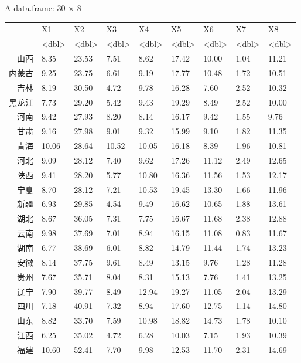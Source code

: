 \documentclass[11pt]{article}
\begin{document}
    A data.frame: 30 × 8
\begin{tabular}{r|llllllll}
  & X1 & X2 & X3 & X4 & X5 & X6 & X7 & X8\\
  & <dbl> & <dbl> & <dbl> & <dbl> & <dbl> & <dbl> & <dbl> & <dbl>\\
\hline
	山西 &  8.35 & 23.53 &  7.51 &  8.62 & 17.42 & 10.00 & 1.04 & 11.21\\
	内蒙古 &  9.25 & 23.75 &  6.61 &  9.19 & 17.77 & 10.48 & 1.72 & 10.51\\
	吉林 &  8.19 & 30.50 &  4.72 &  9.78 & 16.28 &  7.60 & 2.52 & 10.32\\
	黑龙江 &  7.73 & 29.20 &  5.42 &  9.43 & 19.29 &  8.49 & 2.52 & 10.00\\
	河南 &  9.42 & 27.93 &  8.20 &  8.14 & 16.17 &  9.42 & 1.55 &  9.76\\
	甘肃 &  9.16 & 27.98 &  9.01 &  9.32 & 15.99 &  9.10 & 1.82 & 11.35\\
	青海 & 10.06 & 28.64 & 10.52 & 10.05 & 16.18 &  8.39 & 1.96 & 10.81\\
	河北 &  9.09 & 28.12 &  7.40 &  9.62 & 17.26 & 11.12 & 2.49 & 12.65\\
	陕西 &  9.41 & 28.20 &  5.77 & 10.80 & 16.36 & 11.56 & 1.53 & 12.17\\
	宁夏 &  8.70 & 28.12 &  7.21 & 10.53 & 19.45 & 13.30 & 1.66 & 11.96\\
	新疆 &  6.93 & 29.85 &  4.54 &  9.49 & 16.62 & 10.65 & 1.88 & 13.61\\
	湖北 &  8.67 & 36.05 &  7.31 &  7.75 & 16.67 & 11.68 & 2.38 & 12.88\\
	云南 &  9.98 & 37.69 &  7.01 &  8.94 & 16.15 & 11.08 & 0.83 & 11.67\\
	湖南 &  6.77 & 38.69 &  6.01 &  8.82 & 14.79 & 11.44 & 1.74 & 13.23\\
	安徽 &  8.14 & 37.75 &  9.61 &  8.49 & 13.15 &  9.76 & 1.28 & 11.28\\
	贵州 &  7.67 & 35.71 &  8.04 &  8.31 & 15.13 &  7.76 & 1.41 & 13.25\\
	辽宁 &  7.90 & 39.77 &  8.49 & 12.94 & 19.27 & 11.05 & 2.04 & 13.29\\
	四川 &  7.18 & 40.91 &  7.32 &  8.94 & 17.60 & 12.75 & 1.14 & 14.80\\
	山东 &  8.82 & 33.70 &  7.59 & 10.98 & 18.82 & 14.73 & 1.78 & 10.10\\
	江西 &  6.25 & 35.02 &  4.72 &  6.28 & 10.03 &  7.15 & 1.93 & 10.39\\
	福建 & 10.60 & 52.41 &  7.70 &  9.98 & 12.53 & 11.70 & 2.31 & 14.69\\

\end{tabular}
\end{document}
